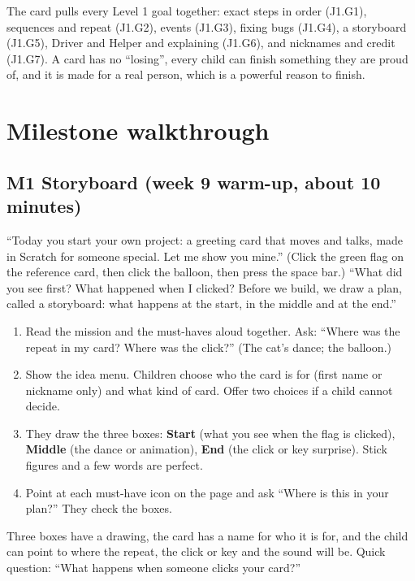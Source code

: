 \documentclass[track=junior,level=1,teacher]{kidscode}
\begin{document}
\begin{teachernote}
The card pulls every Level 1 goal together: exact steps in order (J1.G1), sequences and repeat
(J1.G2), events (J1.G3), fixing bugs (J1.G4), a storyboard (J1.G5), Driver and Helper and explaining
(J1.G6), and nicknames and credit (J1.G7). A card has no \enquote{losing}, every child can finish
something they are proud of, and it is made for a real person, which is a powerful reason to finish.
\end{teachernote}

\section{Milestone walkthrough}

\subsection{M1 Storyboard (week 9 warm-up, about 10 minutes)}
\begin{teacherscript}
\enquote{Today you start your own project: a greeting card that moves and talks, made in Scratch for
someone special. Let me show you mine.} (Click the green flag on the reference card, then click the
balloon, then press the space bar.) \enquote{What did you see first? What happened when I clicked?
Before we build, we draw a plan, called a storyboard: what happens at the start, in the middle and at the end.}
\end{teacherscript}
\begin{enumerate}[itemsep=2pt]
  \item Read the mission and the must-haves aloud together. Ask: \enquote{Where was the repeat in my
        card? Where was the click?} (The cat's dance; the balloon.)
  \item Show the idea menu. Children choose who the card is for (first name or nickname only) and
        what kind of card. Offer two choices if a child cannot decide.
  \item They draw the three boxes: \textbf{Start} (what you see when the flag is clicked),
        \textbf{Middle} (the dance or animation), \textbf{End} (the click or key surprise).
        Stick figures and a few words are perfect.
  \item Point at each must-have icon on the page and ask \enquote{Where is this in your plan?}
        They check the boxes.
\end{enumerate}
\begin{formativecheck}
Three boxes have a drawing, the card has a name for who it is for, and the child can point to where
the repeat, the click or key and the sound will be. Quick question: \enquote{What happens when someone
clicks your card?}
\end{formativecheck}
\end{document}
